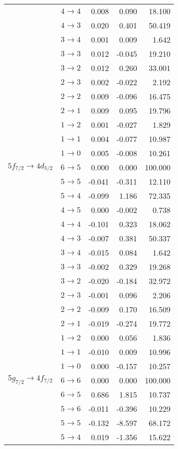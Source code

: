 \begin{table}[b]
\begin{tiny}
\begin{tabular}{cc|rrr}
 & $4 \rightarrow 4$ &0.008&0.090&18.100\\
 & $4 \rightarrow 3$ &0.020&0.401&50.419\\
 & $3 \rightarrow 4$ &0.001&0.009&1.642\\
 & $3 \rightarrow 3$ &0.012&-0.045&19.210\\
 & $3 \rightarrow 2$ &0.012&0.260&33.001\\
 & $2 \rightarrow 3$ &0.002&-0.022&2.192\\
 & $2 \rightarrow 2$ &0.009&-0.096&16.475\\
 & $2 \rightarrow 1$ &0.009&0.095&19.796\\
 & $1 \rightarrow 2$ &0.001&-0.027&1.829\\
 & $1 \rightarrow 1$ &0.004&-0.077&10.987\\
 & $1 \rightarrow 0$ &0.005&-0.008&10.261\\[4pt]
$5f_{7/2} \rightarrow 4d_{5/2}$ & $6 \rightarrow 5$ &0.000&0.000&100.000\\
 & $5 \rightarrow 5$ &-0.041&-0.311&12.110\\
 & $5 \rightarrow 4$ &-0.099&1.186&72.335\\
 & $4 \rightarrow 5$ &0.000&-0.002&0.738\\
 & $4 \rightarrow 4$ &-0.101&0.323&18.062\\
 & $4 \rightarrow 3$ &-0.007&0.381&50.337\\
 & $3 \rightarrow 4$ &-0.015&0.084&1.642\\
 & $3 \rightarrow 3$ &-0.002&0.329&19.268\\
 & $3 \rightarrow 2$ &-0.020&-0.184&32.972\\
 & $2 \rightarrow 3$ &-0.001&0.096&2.206\\
 & $2 \rightarrow 2$ &-0.009&0.170&16.509\\
 & $2 \rightarrow 1$ &-0.019&-0.274&19.772\\
 & $1 \rightarrow 2$ &0.000&0.056&1.836\\
 & $1 \rightarrow 1$ &-0.010&0.009&10.996\\
 & $1 \rightarrow 0$ &0.000&-0.157&10.257\\[4pt]
$5g_{7/2} \rightarrow 4f_{7/2}$ & $6 \rightarrow 6$ &0.000&0.000&100.000\\
 & $6 \rightarrow 5$ &0.686&1.815&10.737\\
 & $5 \rightarrow 6$ &-0.011&-0.396&10.229\\
 & $5 \rightarrow 5$ &-0.132&-8.597&68.172\\
 & $5 \rightarrow 4$ &0.019&-1.356&15.622\\

\end{tabular}
\end{tiny}
\end{table}
